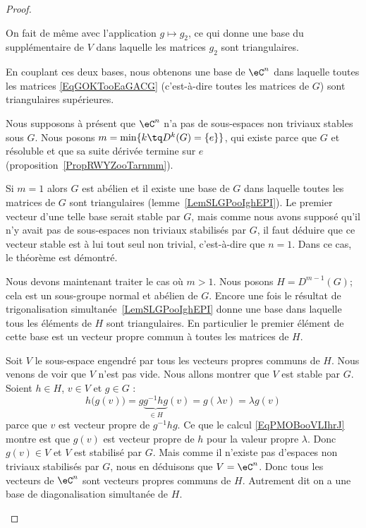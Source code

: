 \begin{proof}
\begin{subproof}
		On fait de même avec l'application \( g\mapsto g_2\), ce qui donne une base du supplémentaire de \( V\) dans laquelle les matrices \( g_2\) sont triangulaires.

		En couplant ces deux bases, nous obtenons une base de \( \eC^n\) dans laquelle toutes les matrices \eqref{EqGOKTooEaGACG} (c'est-à-dire toutes les matrices de \( G\)) sont triangulaires supérieures.

		\spitem[Sinon]
		Nous supposons à présent que \( \eC^n\) n'a pas de sous-espaces non triviaux stables sous \( G\). Nous posons \( m=\min\{ k\tq D^k(G)=\{ e \} \}\), qui existe parce que \( G\) et résoluble et que sa suite dérivée termine sur \( {e}\) (proposition~\ref{PropRWYZooTarnmm}).

		\spitem[Si \( m=1\)]
		Si \( m=1\) alors \( G\) est abélien et il existe une base de \( G\) dans laquelle toutes les matrices de \( G\) sont triangulaires (lemme~\ref{LemSLGPooIghEPI}). Le premier vecteur d'une telle base serait stable par \( G\), mais comme nous avons supposé qu'il n'y avait pas de sous-espaces non triviaux stabilisés par \( G\), il faut déduire que ce vecteur stable est à lui tout seul non trivial, c'est-à-dire que \( n=1\). Dans ce cas, le théorème est démontré.

		\spitem[Si \( m>1\)]
		Nous devons maintenant traiter le cas où \( m>1\). Nous posons \( H=D^{m-1}(G)\); cela est un sous-groupe normal et abélien de \( G\). Encore une fois le résultat de trigonalisation simultanée~\ref{LemSLGPooIghEPI} donne une base dans laquelle tous les éléments de \( H\) sont triangulaires. En particulier le premier élément de cette base est un vecteur propre commun à toutes les matrices de \( H\).

		Soit \( V\) le sous-espace engendré par tous les vecteurs propres communs de \( H\). Nous venons de voir que \( V\) n'est pas vide. Nous allons montrer que \( V\) est stable par \( G\). Soient \( h\in H\), \( v\in V\) et \( g\in G\) :
		\begin{equation}    \label{EqPMOBooVLIhrJ}
			h\big( g(v) \big)=g\underbrace{g^{-1}hg}_{\in H}(v)=g(\lambda v)=\lambda g(v)
		\end{equation}
		parce que \( v\) est vecteur propre de \( g^{-1} hg\). Ce que le calcul \eqref{EqPMOBooVLIhrJ} montre est que \( g(v)\) est vecteur propre de \( h\) pour la valeur propre \( \lambda\). Donc \( g(v)\in V\) et \( V\) est stabilisé par \( G\). Mais comme il n'existe pas d'espaces non triviaux stabilisés par \( G\), nous en déduisons que \( V=\eC^n\). Donc tous les vecteurs de \( \eC^n\) sont vecteurs propres communs de \( H\). Autrement dit on a une base de diagonalisation simultanée de \( H\).


\end{subproof}
\end{proof}
